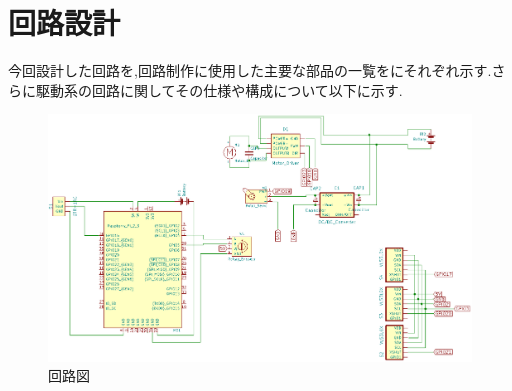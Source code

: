 
\section{回路設計}
今回設計した回路を,回路制作に使用した主要な部品の一覧をにそれぞれ示す.さらに駆動系の回路に関してその仕様や構成について以下に示す.


\begin{figure}[h]
\centering
\includegraphics[scale=0.7]{picture/eps/ele_circuit_fig1.eps}
\caption{回路図}
\label{fig::overall_electric_circuit}
\end{figure}

\clearpage


